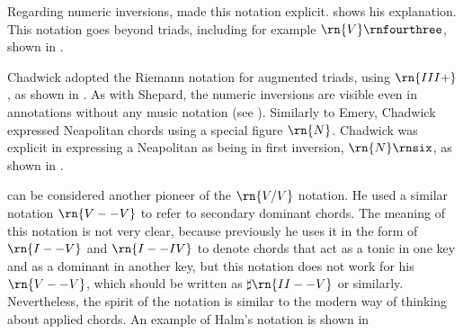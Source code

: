 



Regarding numeric inversions, \textcite{chadwick1897harmony}
made this notation explicit.
shows his explanation. This notation goes beyond triads,
including for example $\rn{V}\rnfourthree$, shown in
.






Chadwick adopted the Riemann notation for augmented triads,
using $\rn{III+}$, as shown in
. As
with Shepard, the numeric inversions are visible even in
annotations without any music notation (see
).
Similarly to Emery, Chadwick expressed Neapolitan chords
using a special figure $\rn{N}$. Chadwick was explicit in
expressing a Neapolitan as being in first inversion,
$\rn{N}\rnsix$, as shown in
.

\textcite{halm1900harmonielehre} can be considered another
pioneer of the $\rn{V/V}$ notation. He used a similar
notation $\rn{V--V}$ to refer to secondary dominant chords.
The meaning of this notation is not very clear, because
previously he uses it in the form of $\rn{I--V}$ and
$\rn{I--IV}$ to denote chords that act as a tonic in one key
and as a dominant in another key, but this notation does not
work for his $\rn{V--V}$, which should be written as
$\sharp{}\rn{II--V}$ or similarly. Nevertheless, the spirit
of the notation is similar to the modern way of thinking
about applied chords. An example of Halm's notation is shown
in

